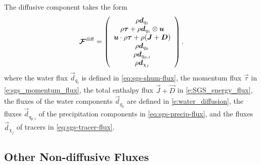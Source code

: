 \documentclass{report}
\begin{document}
 The diffusive component takes the form 
 \begin{equation}
 \boldsymbol{{\mathcal{F}}}^{\mathrm{diff}}=\left( \begin{array}{c}
 \rho\boldsymbol{{d}}_{q_t} \\
 \rho\boldsymbol{{\tau}} + \rho\boldsymbol{{d}}_{q_t} \otimes \boldsymbol{{u}}\\
 \boldsymbol{{u}} \cdot \rho\boldsymbol{{\tau}} + \rho (\boldsymbol{{J}} + \boldsymbol{{D}}) \\
\rho\boldsymbol{{d}}_{q_k}\\
\rho \boldsymbol{{d}}_{q_{p, i}}\\
\rho \boldsymbol{{d}}_{\chi_j}
\end{array}
\right).
\label{eq:diff_flux}
\end{equation}
where the water flux $\vec{d}_{q_t}$ is defined in \eqref{eq:sgs-shum-flux}, the momentum flux $\vec{\tau}$ in \eqref{e:sgs_momentum_flux}, the total enthalpy flux $\vec{J} + \vec{D}$ in \eqref{e:SGS_energy_flux}, the fluxes of the water components $\vec{d}_{q_k}$ are defined in \eqref{e:water_diffusion}, the fluxes $\vec{d}_{q_{p, i}}$ of the precipitation components in \eqref{eq:sgs-precip-flux}, and the fluxes $\vec{d}_{\chi_j}$ of tracers in \eqref{eq:sgs-tracer-flux}.


\subsection{Other Non-diffusive Fluxes}
\end{document}
